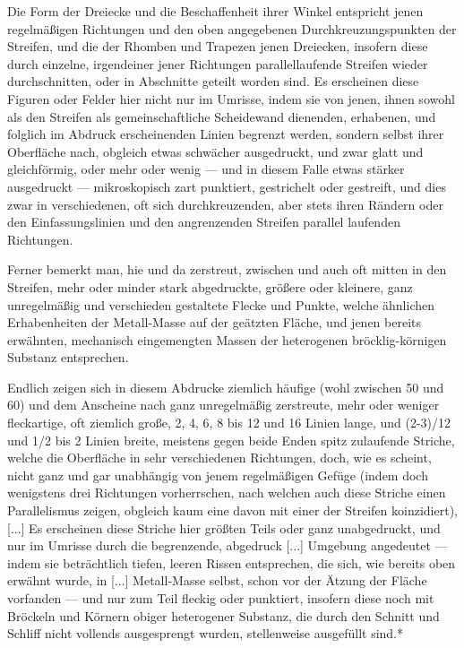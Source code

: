 \documentclass[a4paper, 11pt, oneside, german]{article}
\begin{document}
Die Form der Dreiecke und die Beschaffenheit ihrer Winkel entspricht jenen regelmäßigen Richtungen und den oben angegebenen Durchkreuzungspunkten der Streifen, und die der Rhomben und Trapezen jenen Dreiecken, insofern diese durch einzelne, irgendeiner jener Richtungen parallellaufende Streifen wieder durchschnitten, oder in Abschnitte geteilt worden sind. Es erscheinen diese Figuren oder Felder hier nicht nur im Umrisse, indem sie von jenen, ihnen sowohl als den Streifen als gemeinschaftliche Scheidewand dienenden, erhabenen, und folglich im Abdruck erscheinenden Linien begrenzt werden, sondern selbst ihrer Oberfläche nach, obgleich etwas schwächer ausgedruckt, und zwar glatt und gleichförmig, oder mehr oder wenig --- und in diesem Falle etwas stärker ausgedruckt --- mikroskopisch zart punktiert, gestrichelt oder gestreift, und dies zwar in verschiedenen, oft sich durchkreuzenden, aber stets ihren Rändern oder den Einfassungslinien und den angrenzenden Streifen parallel laufenden Richtungen.

Ferner bemerkt man, hie und da zerstreut, zwischen und auch oft mitten in den Streifen, mehr oder minder stark abgedruckte, größere oder kleinere, ganz unregelmäßig und verschieden gestaltete Flecke und Punkte, welche ähnlichen Erhabenheiten der Metall-Masse auf der geätzten Fläche, und jenen bereits erwähnten, mechanisch eingemengten Massen der heterogenen bröcklig-körnigen Substanz entsprechen.

Endlich zeigen sich in diesem Abdrucke ziemlich häufige (wohl zwischen 50 und 60) und dem Anscheine nach ganz unregelmäßig zerstreute, mehr oder weniger fleckartige, oft ziemlich große, 2, 4, 6, 8 bis 12 und 16 Linien lange, und (2-3)/12 und 1/2 bis 2 Linien breite, meistens gegen beide Enden spitz zulaufende Striche, welche die Oberfläche in sehr verschiedenen Richtungen, doch, wie es scheint, nicht ganz und gar unabhängig von jenem regelmäßigen Gefüge (indem doch wenigstens drei Richtungen vorherrschen, nach welchen auch diese Striche einen Parallelismus zeigen, obgleich kaum eine davon mit einer der Streifen koinzidiert), [...] Es erscheinen diese Striche hier größten Teils oder ganz unabgedruckt, und nur im Umrisse durch die begrenzende, abgedruck [...] Umgebung angedeutet --- indem sie beträchtlich tiefen, leeren Rissen entsprechen, die sich, wie bereits oben erwähnt wurde, in [...] Metall-Masse selbst, schon vor der Ätzung der Fläche vorfanden --- und nur zum Teil fleckig oder punktiert, insofern diese noch mit Bröckeln und Körnern obiger heterogener Substanz, die durch den Schnitt und Schliff nicht vollends ausgesprengt wurden, stellenweise ausgefüllt sind.*
\end{document}
